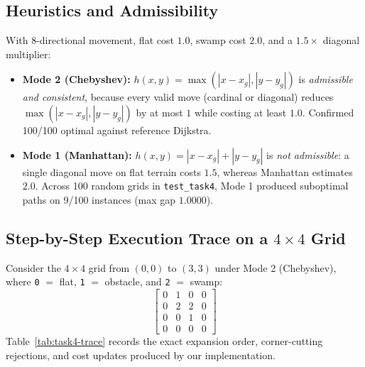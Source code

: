 \documentclass[11pt,a4paper]{article}
\begin{document}
\subsection{Heuristics and Admissibility}
With 8-directional movement, flat cost $1.0$, swamp cost $2.0$, and a $1.5\times$ diagonal multiplier:
\begin{itemize}
    \item \textbf{Mode 2 (Chebyshev):} $h(x,y) = \max(|x-x_g|, |y-y_g|)$ is \emph{admissible and consistent}, because every valid move (cardinal or diagonal) reduces $\max(|x-x_g|, |y-y_g|)$ by at most $1$ while costing at least $1.0$. Confirmed 100/100 optimal against reference Dijkstra.
    \item \textbf{Mode 1 (Manhattan):} $h(x,y) = |x-x_g| + |y-y_g|$ is \emph{not admissible}: a single diagonal move on flat terrain costs $1.5$, whereas Manhattan estimates $2.0$. Across 100 random grids in \texttt{test\_task4}, Mode 1 produced suboptimal paths on 9/100 instances (max gap $1.0000$).
\end{itemize}

\subsection{Step-by-Step Execution Trace on a $4 \times 4$ Grid}
Consider the $4 \times 4$ grid from $(0,0)$ to $(3,3)$ under Mode 2 (Chebyshev), where \texttt{0} $=$ flat, \texttt{1} $=$ obstacle, and \texttt{2} $=$ swamp:
\[
    \begin{bmatrix}
        0 & 1 & 0 & 0 \\
        0 & 2 & 2 & 0 \\
        0 & 0 & 1 & 0 \\
        0 & 0 & 0 & 0
    \end{bmatrix}
\]
Table~\ref{tab:task4-trace} records the exact expansion order, corner-cutting rejections, and cost updates produced by our implementation.
\end{document}
